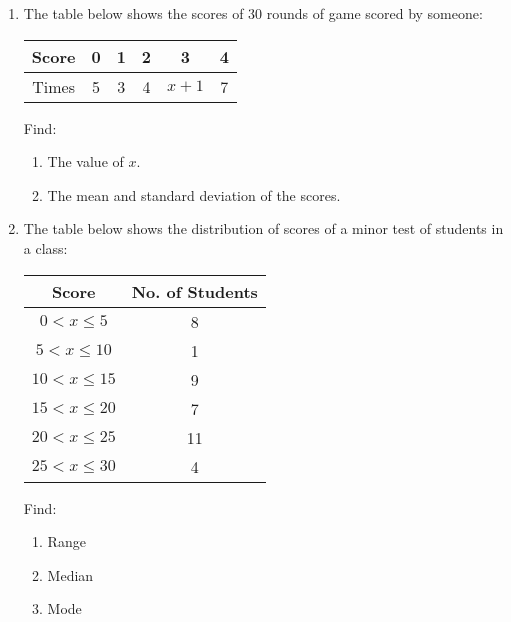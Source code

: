 \documentclass{report}
\begin{document}
\begin{multicols}{2}
\begin{enumerate}
    \item The table below shows the scores of 30 rounds of game scored by someone:
          \begin{center}
            \begin{tabular}{|c|c|c|c|c|c|}
              \hline
              Score & 0 & 1 & 2 & 3     & 4 \\
              \hline
              Times & 5 & 3 & 4 & $x+1$ & 7 \\
              \hline
            \end{tabular}
          \end{center}
          Find:
          \begin{enumerate}
            \item The value of $x$.
            \item The mean and standard deviation of the scores.
          \end{enumerate}

    \item The table below shows the distribution of scores of a minor test of students in
          a class:
          \begin{center}
            \begin{tabular}{|c|c|}
              \hline
              Score            & No. of Students \\
              \hline
              $0 < x \leq 5$   & 8               \\
              $5 < x \leq 10$  & 1               \\
              $10 < x \leq 15$ & 9               \\
              $15 < x \leq 20$ & 7               \\
              $20 < x \leq 25$ & 11              \\
              $25 < x \leq 30$ & 4               \\
              \hline
            \end{tabular}
          \end{center}
          Find:
          \begin{enumerate}
            \item Range
            \item Median
            \item Mode
          \end{enumerate}


\end{enumerate}
\end{multicols}
\end{document}
